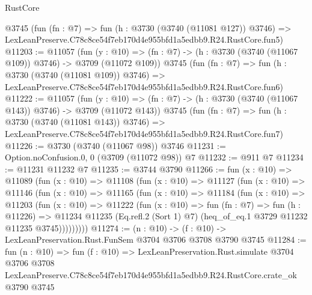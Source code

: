 \begin{lexlean}{RustCore}
\begin{coremodule}
    @3745
    (fun (fn : @7) =>
    fun (h : @3730 (@3740 (@11081 @127)) @3746) =>
    LexLeanPreserve.C78c8ce54f7eb170d4e955bfd1a5edbb9.R24.RustCore.fun5)
@11203 := @11057
    (fun (y : @10) => (fn : @7) -> (h : @3730 (@3740 (@11067 @109)) @3746) -> @3709 (@11072 @109))
    @3745
    (fun (fn : @7) =>
    fun (h : @3730 (@3740 (@11081 @109)) @3746) =>
    LexLeanPreserve.C78c8ce54f7eb170d4e955bfd1a5edbb9.R24.RustCore.fun6)
@11222 := @11057
    (fun (y : @10) => (fn : @7) -> (h : @3730 (@3740 (@11067 @143)) @3746) -> @3709 (@11072 @143))
    @3745
    (fun (fn : @7) =>
    fun (h : @3730 (@3740 (@11081 @143)) @3746) =>
    LexLeanPreserve.C78c8ce54f7eb170d4e955bfd1a5edbb9.R24.RustCore.fun7)
@11226 := @3730 (@3740 (@11067 @98)) @3746
@11231 := Option.noConfusion.{0, 0} (@3709 (@11072 @98)) @7
@11232 := @911 @7
@11234 := @11231 @11232 @7
@11235 := @3744 @3790
@11266 := fun (x : @10) =>
  @11089
    (fun (x : @10) =>
    @11108
      (fun (x : @10) =>
      @11127
        (fun (x : @10) =>
        @11146
          (fun (x : @10) =>
          @11165
            (fun (x : @10) =>
            @11184
              (fun (x : @10) =>
              @11203
                (fun (x : @10) =>
                @11222
                  (fun (x : @10) =>
                  fun (fn : @7) =>
                  fun (h : @11226) =>
                  @11234
                    @11235
                    (Eq.refl.{2} (Sort 1) @7)
                    (heq_of_eq.{1} @3729 @11232 @11235 @3745)))))))))
@11274 := (n : @10) -> (f : @10) -> LexLeanPreservation.Rust.FunSem @3704 @3706 @3708 @3790 @3745
@11284 := fun (n : @10) =>
  fun (f : @10) =>
  LexLeanPreservation.Rust.simulate
    @3704
    @3706
    @3708
    LexLeanPreserve.C78c8ce54f7eb170d4e955bfd1a5edbb9.R24.RustCore.crate_ok
    @3790
    @3745
\end{coremodule}
\end{lexlean}
